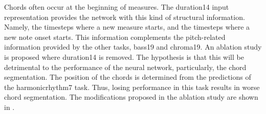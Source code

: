 
Chords often occur at the beginning of measures. The
\gls{duration14} input representation provides the network
with this kind of structural information. Namely, the
timesteps where a new measure starts, and the timesteps
where a new note onset starts. This information complements
the pitch-related information provided by the other tasks,
\gls{bass19} and \gls{chroma19}. An ablation study is
proposed where \gls{duration14} is removed. The hypothesis
is that this will be detrimental to the performance of the
neural network, particularly, the chord segmentation. The
position of the chords is determined from the predictions of
the \gls{harmonicrhythm7} task. Thus, losing performance in
this task results in worse chord segmentation. The
modifications proposed in the ablation study are shown in
.

